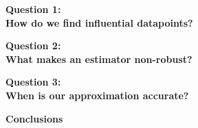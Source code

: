 \documentclass[10pt]{beamer}\usepackage[]{graphicx}\usepackage[]{color}
\begin{document}


\begin{frame}{}

{\Large \textbf{Question 1:} \\ \vspace{0.5em}
\textbf{How do we find influential datapoints?}}

\end{frame}



\begin{frame}{}

{\Large \textbf{Question 2:} \\ \vspace{0.5em}
\textbf{What makes an estimator non-robust?}}

\end{frame}



\begin{frame}{}

{\Large \textbf{Question 3:} \\ \vspace{0.5em}
\textbf{When is our approximation accurate?}}

\end{frame}



\begin{frame}{}

{\Large \textbf{Conclusions} }

\end{frame}


\end{document}
